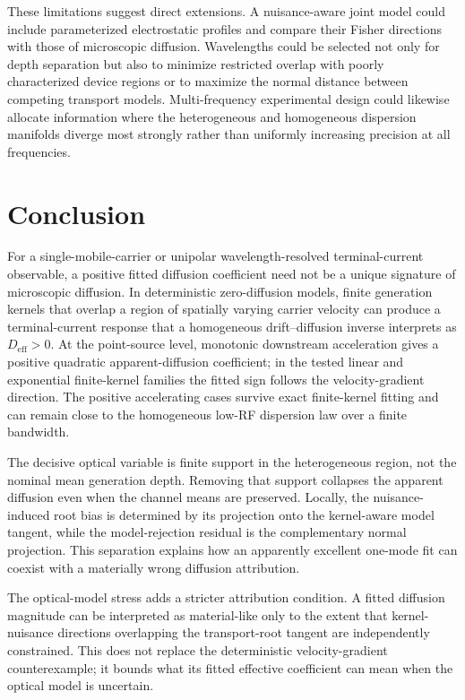 \documentclass[aps,pra,twocolumn,superscriptaddress,nofootinbib]{revtex4-2}
\newcommand{\Deff}{D_{\mathrm{eff}}}
\begin{document}
These limitations suggest direct extensions. A nuisance-aware joint model could include parameterized electrostatic profiles and compare their Fisher directions with those of microscopic diffusion. Wavelengths could be selected not only for depth separation but also to minimize restricted overlap with poorly characterized device regions or to maximize the normal distance between competing transport models. Multi-frequency experimental design could likewise allocate information where the heterogeneous and homogeneous dispersion manifolds diverge most strongly rather than uniformly increasing precision at all frequencies.

\section{Conclusion}

For a single-mobile-carrier or unipolar wavelength-resolved terminal-current observable, a positive fitted diffusion coefficient need not be a unique signature of microscopic diffusion. In deterministic zero-diffusion models, finite generation kernels that overlap a region of spatially varying carrier velocity can produce a terminal-current response that a homogeneous drift--diffusion inverse interprets as $\Deff>0$.  At the point-source level, monotonic downstream acceleration gives a positive quadratic apparent-diffusion coefficient; in the tested linear and exponential finite-kernel families the fitted sign follows the velocity-gradient direction.  The positive accelerating cases survive exact finite-kernel fitting and can remain close to the homogeneous low-RF dispersion law over a finite bandwidth.

The decisive optical variable is finite support in the heterogeneous region, not the nominal mean generation depth. Removing that support collapses the apparent diffusion even when the channel means are preserved. Locally, the nuisance-induced root bias is determined by its projection onto the kernel-aware model tangent, while the model-rejection residual is the complementary normal projection. This separation explains how an apparently excellent one-mode fit can coexist with a materially wrong diffusion attribution.

The optical-model stress adds a stricter attribution condition. A fitted diffusion magnitude can be interpreted as material-like only to the extent that kernel-nuisance directions overlapping the transport-root tangent are independently constrained. This does not replace the deterministic velocity-gradient counterexample; it bounds what its fitted effective coefficient can mean when the optical model is uncertain.
\end{document}
